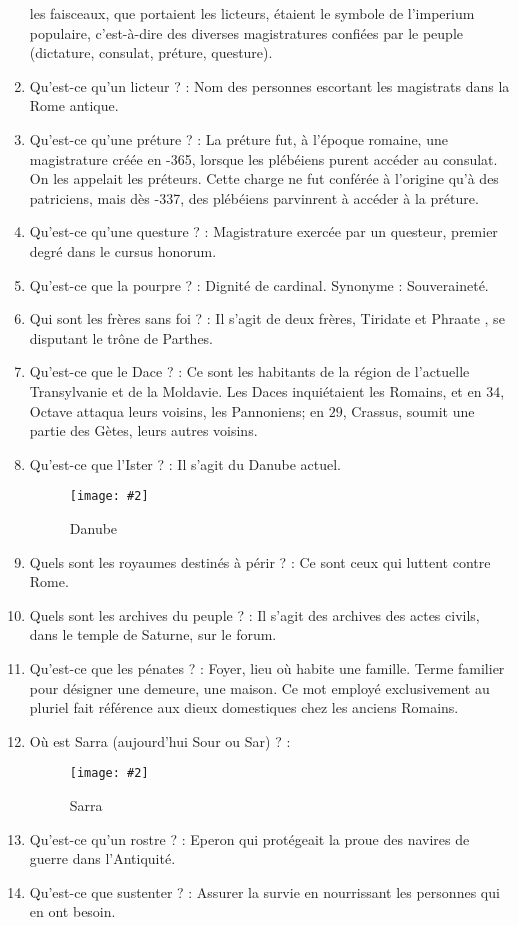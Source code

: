 \documentclass[a4paper, 11pt, hidelinks]{article}
\newcommand{\img}[4]{\begin{figure}[!ht]
    \centering
    \texttt{[image: \#2]}
    \caption{#3}
    \label{#4}
    \end{figure} }
\begin{document}
\begin{enumerate}
            les faisceaux, que portaient les licteurs, étaient le symbole de l'imperium populaire, c'est-à-dire des diverses magistratures
            confiées par le peuple (dictature, consulat, préture, questure).
      \item Qu'est-ce qu'un licteur ? : Nom des personnes escortant les magistrats dans la Rome antique.
      \item Qu'est-ce qu'une préture ? : La préture fut, à l'époque romaine, une magistrature créée en -365, lorsque les plébéiens purent accéder au consulat. On les appelait les préteurs. Cette charge ne fut conférée à 
            l'origine qu'à des patriciens, mais dès -337, des plébéiens parvinrent à accéder à la préture.
      \item Qu'est-ce qu'une questure ? : Magistrature exercée par un questeur, premier degré dans le cursus honorum.
      \item Qu'est-ce que la pourpre ? : Dignité de cardinal. Synonyme : Souveraineté.
      \item Qui sont les frères sans foi ? : Il s'agit de deux frères, Tiridate et Phraate , se disputant le trône de Parthes.
      \item Qu'est-ce que le Dace ? : Ce sont les habitants de la région de l'actuelle Transylvanie et de la Moldavie. Les Daces
            inquiétaient les Romains, et en $34$, Octave attaqua leurs voisins, les Pannoniens; en $29$, Crassus, soumit une partie
            des Gètes, leurs autres voisins.
      \item Qu'est-ce que l'Ister ? : Il s'agit du Danube actuel.
            \img{0.3}{Danube.jpg}{Danube}{105}
      \item Quels sont les royaumes destinés à périr ? : Ce sont ceux qui luttent contre Rome.
      \item Quels sont les archives du peuple ? : Il s'agit des archives des actes civils, dans le temple de Saturne, sur le forum.
      \item Qu'est-ce que les pénates ? : Foyer, lieu où habite une famille. Terme familier pour désigner une demeure, une maison. Ce mot employé exclusivement au pluriel fait référence 
            aux dieux domestiques chez les anciens Romains.
      \item Où est Sarra (aujourd'hui Sour ou Sar) ? :
            \img{0.45}{Sarra.png}{Sarra}{106}
      \item Qu'est-ce qu'un rostre ? : Eperon qui protégeait la proue des navires de guerre dans l'Antiquité.
      \item Qu'est-ce que sustenter ? : Assurer la survie en nourrissant les personnes qui en ont besoin.

\end{enumerate}
\end{document}
